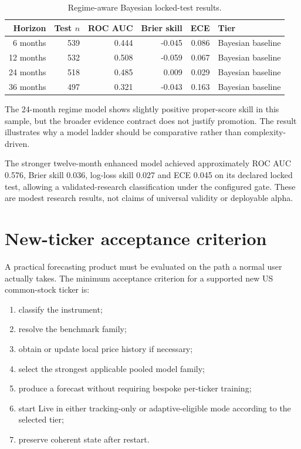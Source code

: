 \documentclass[11pt]{article}
\begin{document}
\begin{table}[ht]
\centering
\caption{Regime-aware Bayesian locked-test results.}
\begin{tabular}{rrrrrl}
\toprule
Horizon & Test $n$ & ROC AUC & Brier skill & ECE & Tier\\
\midrule
6 months  & 539 & 0.444 & -0.045 & 0.086 & Bayesian baseline\\
12 months & 532 & 0.508 & -0.059 & 0.067 & Bayesian baseline\\
24 months & 518 & 0.485 &  0.009 & 0.029 & Bayesian baseline\\
36 months & 497 & 0.321 & -0.043 & 0.163 & Bayesian baseline\\
\bottomrule
\end{tabular}
\end{table}

The 24-month regime model shows slightly positive proper-score skill in this sample, but the broader evidence contract does not justify promotion. The result illustrates why a model ladder should be comparative rather than complexity-driven.

The stronger twelve-month enhanced model achieved approximately ROC AUC 0.576, Brier skill 0.036, log-loss skill 0.027 and ECE 0.045 on its declared locked test, allowing a validated-research classification under the configured gate. These are modest research results, not claims of universal validity or deployable alpha.

\section{New-ticker acceptance criterion}
A practical forecasting product must be evaluated on the path a normal user actually takes. The minimum acceptance criterion for a supported new US common-stock ticker is:
\begin{enumerate}[itemsep=0.2em]
\item classify the instrument;
\item resolve the benchmark family;
\item obtain or update local price history if necessary;
\item select the strongest applicable pooled model family;
\item produce a forecast without requiring bespoke per-ticker training;
\item start Live in either tracking-only or adaptive-eligible mode according to the selected tier;
\item preserve coherent state after restart.
\end{enumerate}
\end{document}

